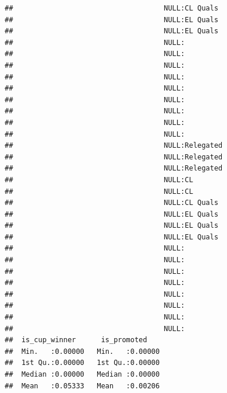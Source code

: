 \documentclass{article}\usepackage[]{graphicx}\usepackage[]{color}
\makeatletter
\newenvironment{kframe}{%
 \def\at@end@of@kframe{}%
 \ifinner\ifhmode%
  \def\at@end@of@kframe{\end{minipage}}%
  \begin{minipage}{\columnwidth}%
 \fi\fi%
 \def\FrameCommand##1{\hskip\@totalleftmargin \hskip-\fboxsep
 \colorbox{shadecolor}{##1}\hskip-\fboxsep
     \hskip-\linewidth \hskip-\@totalleftmargin \hskip\columnwidth}%
 \MakeFramed {\advance\hsize-\width
   \@totalleftmargin\z@ \linewidth\hsize
   \@setminipage}}%
 {\par\unskip\endMakeFramed%
 \at@end@of@kframe}
\newenvironment{knitrout}{}{} %
\makeatother
\begin{document}
\begin{knitrout}
\begin{kframe}
\begin{verbatim}
##                                    NULL:CL Quals                               
##                                    NULL:EL Quals                               
##                                    NULL:EL Quals                               
##                                    NULL:                                       
##                                    NULL:                                       
##                                    NULL:                                       
##                                    NULL:                                       
##                                    NULL:                                       
##                                    NULL:                                       
##                                    NULL:                                       
##                                    NULL:                                       
##                                    NULL:                                       
##                                    NULL:Relegated                              
##                                    NULL:Relegated                              
##                                    NULL:Relegated                              
##                                    NULL:CL                                     
##                                    NULL:CL                                     
##                                    NULL:CL Quals                               
##                                    NULL:EL Quals                               
##                                    NULL:EL Quals                               
##                                    NULL:EL Quals                               
##                                    NULL:                                       
##                                    NULL:                                       
##                                    NULL:                                       
##                                    NULL:                                       
##                                    NULL:                                       
##                                    NULL:                                       
##                                    NULL:                                       
##                                    NULL:                                       
##  is_cup_winner      is_promoted     
##  Min.   :0.00000   Min.   :0.00000  
##  1st Qu.:0.00000   1st Qu.:0.00000  
##  Median :0.00000   Median :0.00000  
##  Mean   :0.05333   Mean   :0.00206  

\end{verbatim}
\end{kframe}
\end{knitrout}
\end{document}
